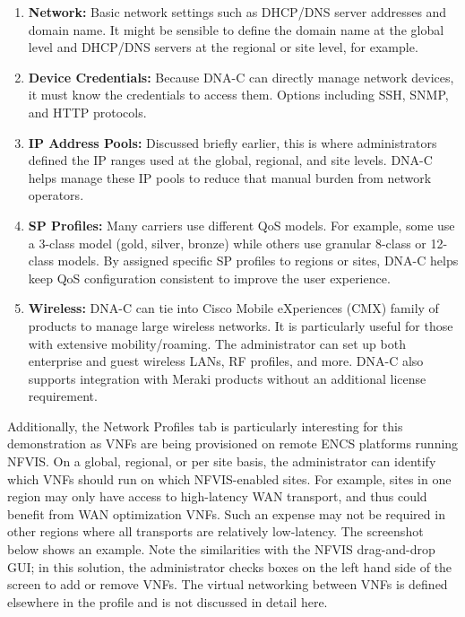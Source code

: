 \begin{enumerate}
  \item \textbf{Network:} Basic network settings such as DHCP/DNS server
  addresses and domain name. It might be sensible to define the domain name at
  the global level and DHCP/DNS servers at the regional or site level, for example.
  \item \textbf{Device Credentials:} Because DNA-C can directly manage network
  devices, it must know the credentials to access them. Options including SSH,
  SNMP, and HTTP protocols.
  \item \textbf{IP Address Pools:} Discussed briefly earlier, this is where
  administrators defined the IP ranges used at the global, regional, and site
  levels. DNA-C helps manage these IP pools to reduce that manual burden from
  network operators.
  \item \textbf{SP Profiles:} Many carriers use different QoS models. For
  example, some use a 3-class model (gold, silver, bronze) while others use
  granular 8-class or 12-class models. By assigned specific SP profiles to
  regions or sites, DNA-C helps keep QoS configuration consistent to improve
  the user experience.
  \item \textbf{Wireless:} DNA-C can tie into Cisco Mobile eXperiences (CMX)
  family of products to manage large wireless networks. It is particularly
  useful for those with extensive mobility/roaming. The administrator can set
  up both enterprise and guest wireless LANs, RF profiles, and more. DNA-C
  also supports integration with Meraki products without an additional license requirement.
\end{enumerate}


Additionally, the Network Profiles tab is particularly interesting for this
demonstration as VNFs are being provisioned on remote ENCS platforms running
NFVIS\@. On a global, regional, or per site basis, the administrator can
identify which VNFs should run on which NFVIS-enabled sites. For example,
sites in one region may only have access to high-latency WAN transport, and
thus could benefit from WAN optimization VNFs. Such an expense may not be
required in other regions where all transports are relatively low-latency. The
screenshot below shows an example. Note the similarities with the NFVIS
drag-and-drop GUI\@; in this solution, the administrator checks boxes on the
left hand side of the screen to add or remove VNFs. The virtual networking
between VNFs is defined elsewhere in the profile and is not discussed in
detail here.

